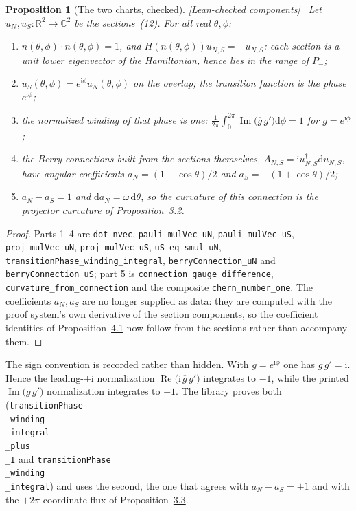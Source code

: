 \documentclass[11pt]{article}
\newtheorem{proposition}[theorem]{Proposition}
\theoremstyle{definition}\newtheorem{definition}[theorem]{Definition}
\theoremstyle{remark}\newtheorem{remark}[theorem]{Remark}
\newcommand{\ii}{\mathrm{i}}
\newcommand{\dd}{\mathrm{d}}
\newcommand{\R}{\mathbb{R}}
\newcommand{\C}{\mathbb{C}}
\newcommand{\checked}{\textnormal{\small[Lean-checked components]}\ }
\begin{document}
\begin{proposition}[The two charts, checked]\label{prop:bundle}\checked
Let $u_N,u_S:\R^2\to\C^2$ be the sections~\hyperref[eq:states]{(12)}. For all real $\theta,\phi$:
\begin{enumerate}\itemsep0.2em
\item $n(\theta,\phi)\cdot n(\theta,\phi)=1$, and $H(n(\theta,\phi))u_{N,S}=-u_{N,S}$: each section
is a unit lower eigenvector of the Hamiltonian, hence lies in the range of $P_-$;
\item $u_S(\theta,\phi)=e^{\ii\phi}u_N(\theta,\phi)$ on the overlap; the transition function is the
phase $e^{\ii\phi}$;
\item the normalized winding of that phase is one:
$\frac1{2\pi}\int_0^{2\pi}\operatorname{Im}\bigl(\overline{g}\,g'\bigr)\dd\phi=1$ for $g=e^{\ii\phi}$;
\item the Berry connections built from the sections themselves,
$A_{N,S}=\ii u_{N,S}^\dagger\dd u_{N,S}$, have angular coefficients
$a_N=(1-\cos\theta)/2$ and $a_S=-(1+\cos\theta)/2$;
\item $a_N-a_S=1$ and $\dd a_N=\omega\,\dd\theta$, so the curvature of this connection is the
projector curvature of Proposition~\hyperref[prop:curvature]{3.2}.
\end{enumerate}
\end{proposition}
\begin{proof}
Parts 1--4 are \texttt{dot\_nvec}, \texttt{pauli\_mulVec\_uN},
\texttt{pauli\_mulVec\_uS}, \texttt{proj\_mulVec\_uN}, \texttt{proj\_mulVec\_uS},
\texttt{uS\_eq\_smul\_uN}, \texttt{transitionPhase\_winding\_integral},
\texttt{berryConnection\_uN} and \texttt{berryConnection\_uS}; part 5 is
\texttt{connection\_gauge\_difference}, \texttt{curvature\_from\_connection} and the composite
\texttt{chern\_number\_one}. The coefficients $a_N,a_S$ are no longer supplied as data: they are
computed with the proof system's own derivative of the section components, so the coefficient
identities of Proposition~\hyperref[prop:charts]{4.1} now follow from the sections rather than accompany them.
\end{proof}

The sign convention is recorded rather than hidden. With $g=e^{\ii\phi}$ one has
$\overline g\,g'=\ii$. Hence the leading-$+\ii$ normalization
$\operatorname{Re}\bigl(\ii\,\overline g\,g'\bigr)$ integrates to $-1$, while the printed
$\operatorname{Im}\bigl(\overline g\,g'\bigr)$ normalization integrates to $+1$. The library proves
both (\texttt{transitionPhase\\_winding\\_integral\\_plus\\_I} and
\texttt{transitionPhase\\_winding\\_integral}) and uses the second, the one that agrees with
$a_N-a_S=+1$ and with the $+2\pi$ coordinate flux of Proposition~\hyperref[prop:flux]{3.3}.
\end{document}
